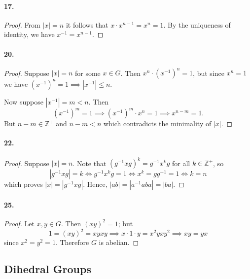 \documentclass{article}
\begin{document}
\paragraph{17.}
\begin{proof}
  From $|x| = n$ it follows that $x \cdot x^{n-1} = x^n = 1$. By the uniqueness
  of identity, we have $x^{-1} = x^{n-1}$.
\end{proof}

\paragraph{20.}
\begin{proof}
  Suppose $|x| = n$ for some $x \in G$. Then $x^n \cdot (x^{-1})^n = 1$, but
  since $x^n = 1$ we have $(x^{-1})^n = 1 \implies |x^{-1}| \leq n$.

  Now suppose $|x^{-1}| = m < n$. Then \[
    (x^{-1})^m = 1 \implies (x^{-1})^m \cdot x^n = 1 \implies x^{n-m} = 1.
  \] But $n - m \in \mathbb{Z}^+$ and $n - m < n$ which contradicts the
  minimality of $|x|$.
\end{proof}

\paragraph{22.}
\begin{proof}
  Suppose $|x| = n$. Note that $(g^{-1}xg)^k = g^{-1}x^kg$ for all $k \in
  \mathbb{Z}^+$, so \[
    |g^{-1}xg| = k \iff g^{-1}x^kg = 1 \iff x^k = gg^{-1} = 1 \iff k = n
  \] which proves $|x| = |g^{-1}xg|$. Hence, $|ab| = |a^{-1}aba| = |ba|$.
\end{proof}

\paragraph{25.}
\begin{proof}
  Let $x, y \in G$. Then $(xy)^2 = 1$; but \[
    1 = (xy)^2 = xyxy \implies x \cdot 1 \cdot y = x^2yxy^2 \implies xy = yx
  \] since $x^2 = y^2 = 1$. Therefore $G$ is abelian.
\end{proof}

\subsection{Dihedral Groups}
\end{document}
